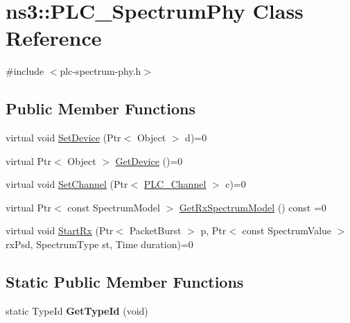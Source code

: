 \hypertarget{classns3_1_1PLC__SpectrumPhy}{\section{ns3\-:\-:\-P\-L\-C\-\_\-\-Spectrum\-Phy \-Class \-Reference}
\label{classns3_1_1PLC__SpectrumPhy}
}


{\ttfamily \#include $<$plc-\/spectrum-\/phy.\-h$>$}

\subsection*{\-Public \-Member \-Functions}
\begin{DoxyCompactItemize}
\item 
virtual void \hyperlink{classns3_1_1PLC__SpectrumPhy_a2675707ef0723179272b3061ede2d6c3}{\-Set\-Device} (\-Ptr$<$ \-Object $>$ d)=0
\item 
virtual \-Ptr$<$ \-Object $>$ \hyperlink{classns3_1_1PLC__SpectrumPhy_ac70e432f5b57931a83a5c19c737aea7c}{\-Get\-Device} ()=0
\item 
virtual void \hyperlink{classns3_1_1PLC__SpectrumPhy_aa4376915a9c4b950111412d77bf105a7}{\-Set\-Channel} (\-Ptr$<$ \hyperlink{classns3_1_1PLC__Channel}{\-P\-L\-C\-\_\-\-Channel} $>$ c)=0
\item 
virtual \-Ptr$<$ const \-Spectrum\-Model $>$ \hyperlink{classns3_1_1PLC__SpectrumPhy_a28b28091075d30da4a37cdb6d2ff45ab}{\-Get\-Rx\-Spectrum\-Model} () const =0
\item 
virtual void \hyperlink{classns3_1_1PLC__SpectrumPhy_abb4e75a04569d7bcac70ad0530455658}{\-Start\-Rx} (\-Ptr$<$ \-Packet\-Burst $>$ p, \-Ptr$<$ const \-Spectrum\-Value $>$ rx\-Psd, \-Spectrum\-Type st, \-Time duration)=0
\end{DoxyCompactItemize}
\subsection*{\-Static \-Public \-Member \-Functions}
\begin{DoxyCompactItemize}
\item 
\hypertarget{classns3_1_1PLC__SpectrumPhy_a05068b1283b55b51cf612c0369e7dda0}{static \-Type\-Id {\bfseries \-Get\-Type\-Id} (void)}\label{classns3_1_1PLC__SpectrumPhy_a05068b1283b55b51cf612c0369e7dda0}

\end{DoxyCompactItemize}


